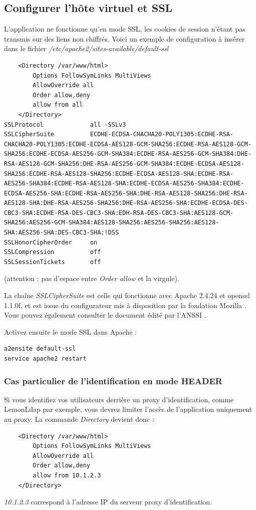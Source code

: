 \subsection{Configurer l'hôte virtuel et SSL}
L'application ne fonctionne qu'en mode SSL, les cookies de session n'étant pas transmis sur des liens non chiffrés. Voici un exemple de configuration à insérer dans le fichier \textit{/etc/apache2/sites-available/default-ssl}
\begin{lstlisting}
    <Directory /var/www/html>
        Options FollowSymLinks MultiViews
        AllowOverride all
        Order allow,deny
        allow from all
    </Directory>
SSLProtocol             all -SSLv3
SSLCipherSuite          ECDHE-ECDSA-CHACHA20-POLY1305:ECDHE-RSA-CHACHA20-POLY1305:ECDHE-ECDSA-AES128-GCM-SHA256:ECDHE-RSA-AES128-GCM-SHA256:ECDHE-ECDSA-AES256-GCM-SHA384:ECDHE-RSA-AES256-GCM-SHA384:DHE-RSA-AES128-GCM-SHA256:DHE-RSA-AES256-GCM-SHA384:ECDHE-ECDSA-AES128-SHA256:ECDHE-RSA-AES128-SHA256:ECDHE-ECDSA-AES128-SHA:ECDHE-RSA-AES256-SHA384:ECDHE-RSA-AES128-SHA:ECDHE-ECDSA-AES256-SHA384:ECDHE-ECDSA-AES256-SHA:ECDHE-RSA-AES256-SHA:DHE-RSA-AES128-SHA256:DHE-RSA-AES128-SHA:DHE-RSA-AES256-SHA256:DHE-RSA-AES256-SHA:ECDHE-ECDSA-DES-CBC3-SHA:ECDHE-RSA-DES-CBC3-SHA:EDH-RSA-DES-CBC3-SHA:AES128-GCM-SHA256:AES256-GCM-SHA384:AES128-SHA256:AES256-SHA256:AES128-SHA:AES256-SHA:DES-CBC3-SHA:!DSS
SSLHonorCipherOrder     on
SSLCompression          off
SSLSessionTickets       off

\end{lstlisting}

(attention : pas d'espace entre \textit{Order allow} et la virgule).

La chaîne \textit{SSLCipherSuite} est celle qui fonctionne avec Apache 2.4.24 et openssl 1.1.0f, et est issue du configurateur mis à disposition par la fondation Mozilla \cite{mozillagenerator}. 
Vous pouvez également consulter le document édité par l'ANSSI \cite{tls}. 

Activez ensuite le mode SSL dans Apache :
\begin{lstlisting}
a2ensite default-ssl
service apache2 restart
\end{lstlisting}

\subsubsection{Cas particulier de l'identification en mode HEADER}

Si vous identifiez vos utilisateurs derrière un proxy d'identification, comme Lemon\-Ldap par exemple, vous devrez limiter l'accès de l'application uniquement au proxy. La commande \textit{Directory} devient donc :
\begin{lstlisting}
    <Directory /var/www/html>
        Options FollowSymLinks MultiViews
        AllowOverride all
        Order allow,deny
        allow from 10.1.2.3
    </Directory>

\end{lstlisting}
\textit{10.1.2.3} correspond à l'adresse IP du serveur proxy d'identification.

